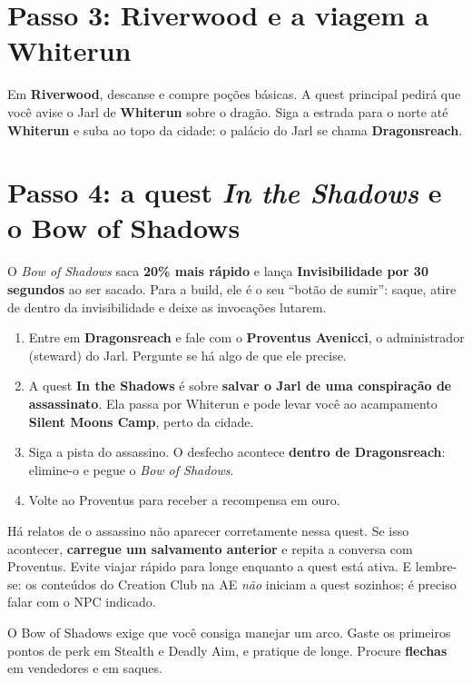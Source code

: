 \documentclass[11pt,a4paper,oneside,openany]{book}
\newcommand{\quest}[1]{\textsf{\textbf{\textcolor{NecroEmerald}{#1}}}}
\newcommand{\lugar}[1]{\textbf{\textcolor{ImperialGold!75!black}{#1}}}
\newcommand{\npc}[1]{\textbf{#1}}
\newcommand{\objeto}[1]{\textit{\textcolor{NecroEmerald}{#1}}}
\newcommand{\perk}[1]{\textsf{\textcolor{SoulCairnPurple}{#1}}}
\begin{document}
\section{Passo 3: Riverwood e a viagem a Whiterun}
Em \lugar{Riverwood}, descanse e compre poções básicas. A quest principal pedirá que você avise o Jarl de \lugar{Whiterun} sobre o dragão. Siga a estrada para o norte até \lugar{Whiterun} e suba ao topo da cidade: o palácio do Jarl se chama \lugar{Dragonsreach}.

\Needspace{6cm}
\section{Passo 4: a quest \emph{In the Shadows} e o Bow of Shadows}
\begin{exploit}
O \objeto{Bow of Shadows} saca \textbf{20\% mais rápido} e lança \textbf{Invisibilidade por 30 segundos} ao ser sacado. Para a build, ele é o seu ``botão de sumir'': saque, atire de dentro da invisibilidade e deixe as invocações lutarem.
\end{exploit}

\begin{enumerate}
  \item Entre em \lugar{Dragonsreach} e fale com o \npc{Proventus Avenicci}, o administrador (steward) do Jarl. Pergunte se há algo de que ele precise.
  \item A quest \quest{In the Shadows} é sobre \textbf{salvar o Jarl de uma conspiração de assassinato}. Ela passa por Whiterun e pode levar você ao acampamento \lugar{Silent Moons Camp}, perto da cidade.
  \item Siga a pista do assassino. O desfecho acontece \textbf{dentro de Dragonsreach}: elimine-o e pegue o \objeto{Bow of Shadows}.
  \item Volte ao Proventus para receber a recompensa em ouro.
\end{enumerate}

\begin{alerta}
Há relatos de o assassino não aparecer corretamente nessa quest. Se isso acontecer, \textbf{carregue um salvamento anterior} e repita a conversa com Proventus. Evite viajar rápido para longe enquanto a quest está ativa. E lembre-se: os conteúdos do Creation Club na AE \emph{não} iniciam a quest sozinhos; é preciso falar com o NPC indicado.
\end{alerta}

\begin{dica}
O Bow of Shadows exige que você consiga manejar um arco. Gaste os primeiros pontos de perk em \perk{Stealth} e \perk{Deadly Aim}, e pratique de longe. Procure \textbf{flechas} em vendedores e em saques.
\end{dica}
\end{document}
